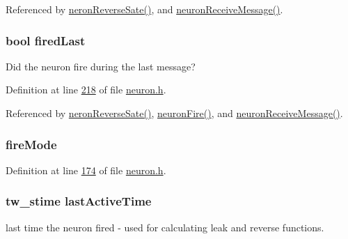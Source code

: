 Referenced by \hyperlink{neuron_8c_source_l00232}{neron\+Reverse\+Sate()}, and \hyperlink{neuron_8c_source_l00103}{neuron\+Receive\+Message()}.

\hypertarget{structneuron_state_a287eb8703dbfb177165d31c8840646b8}{}
\subsubsection[{fired\+Last}]{\setlength{\rightskip}{0pt plus 5cm}bool fired\+Last}\label{structneuron_state_a287eb8703dbfb177165d31c8840646b8}


Did the neuron fire during the last message? 



Definition at line \hyperlink{neuron_8h_source_l00218}{218} of file \hyperlink{neuron_8h_source}{neuron.\+h}.



Referenced by \hyperlink{neuron_8c_source_l00232}{neron\+Reverse\+Sate()}, \hyperlink{neuron_8c_source_l00167}{neuron\+Fire()}, and \hyperlink{neuron_8c_source_l00103}{neuron\+Receive\+Message()}.

\hypertarget{structneuron_state_a55890f9e021064df30e9d18a9df98845}{}
\subsubsection[{fire\+Mode}]{ fire\+Mode}\label{structneuron_state_a55890f9e021064df30e9d18a9df98845}


Definition at line \hyperlink{neuron_8h_source_l00174}{174} of file \hyperlink{neuron_8h_source}{neuron.\+h}.

\hypertarget{structneuron_state_a0658ad1f8b57a00589c6ea84f9a4ab13}{}
\subsubsection[{last\+Active\+Time}]{\setlength{\rightskip}{0pt plus 5cm}tw\+\_\+stime last\+Active\+Time}\label{structneuron_state_a0658ad1f8b57a00589c6ea84f9a4ab13}


last time the neuron fired -\/ used for calculating leak and reverse functions. 

